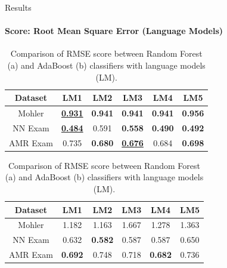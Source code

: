\documentclass[aspectratio=169]{beamer}
\begin{document}
\begin{frame}{Results}
\framesubtitle{Score: Root Mean Square Error (Language Models)}
\begin{table}
\begin{subtable}[c]{0.7\textwidth}
	\centering
	\begin{tabular}{|c|c|c|c|c|c|}
		\hline
		Dataset & LM1 & LM2 & LM3 & LM4 & LM5 \\
		\hline
		Mohler &\underline{\textbf{0.931}}& \textbf{0.941}& \textbf{0.941}& \textbf{0.941}& \textbf{0.956}\\
		\hline
		NN Exam &\underline{\textbf{0.484}}& {0.591}& \textbf{0.558}& \textbf{0.490}& \textbf{0.492}\\
		\hline
		AMR Exam &0.735& \textbf{0.680}& \underline{\textbf{0.676}}& 0.684& \textbf{0.698}\\
		\hline
	\end{tabular}
	\subcaption{}
\end{subtable}
\begin{subtable}[c]{0.7\textwidth}
	\centering
	\begin{tabular}{|c|c|c|c|c|c|}
		\hline
		Dataset & LM1 & LM2 & LM3 & LM4 & LM5 \\
		\hline
		Mohler &1.182& 1.163& 1.667& 1.278& 1.363 \\
		\hline
		NN Exam &0.632& \textbf{0.582}& 0.587& 0.587& 0.650\\
		\hline
		AMR Exam &\textbf{0.692}& 0.748& 0.718& \textbf{0.682}& 0.736\\
		\hline
	\end{tabular}	
	\subcaption{}
\end{subtable}
\caption{Comparison of RMSE score between Random Forest (a) and AdaBoost (b) classifiers with language models (LM).}
\end{table}
\end{frame}
\end{document}
